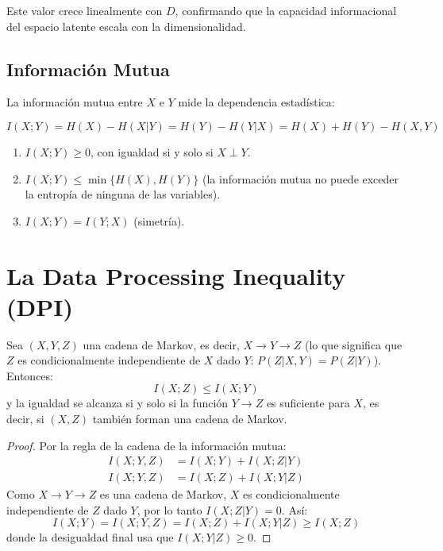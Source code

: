 Este valor crece linealmente con $D$, confirmando que la capacidad informacional
del espacio latente escala con la dimensionalidad.

\subsection{Información Mutua}

La información mutua entre $X$ e $Y$ mide la dependencia estadística:

\begin{equation}
I(X; Y) = H(X) - H(X|Y) = H(Y) - H(Y|X) = H(X) + H(Y) - H(X,Y)
\label{eq:mutual_info}
\end{equation}

\begin{theorem}
\label{thm:mi_props}
\begin{enumerate}
\item $I(X; Y) \ge 0$, con igualdad si y solo si $X \perp Y$.
\item $I(X; Y) \le \min\{H(X), H(Y)\}$ (la información mutua no puede exceder
la entropía de ninguna de las variables).
\item $I(X; Y) = I(Y; X)$ (simetría).
\end{enumerate}
\end{theorem}

\section{La Data Processing Inequality (DPI)}

\begin{theorem}
\label{thm:dpi_formal}
Sea $(X, Y, Z)$ una cadena de Markov, es decir, $X \to Y \to Z$
(lo que significa que $Z$ es condicionalmente independiente de $X$ dado $Y$:
$P(Z|X,Y) = P(Z|Y)$). Entonces:
\begin{equation}
I(X; Z) \le I(X; Y)
\label{eq:dpi}
\end{equation}
y la igualdad se alcanza si y solo si la función $Y \to Z$ es suficiente
para $X$, es decir, si $(X, Z)$ también forman una cadena de Markov.
\end{theorem}

\begin{proof}
Por la regla de la cadena de la información mutua:
\begin{align}
I(X; Y, Z) &= I(X; Y) + I(X; Z | Y) \\
I(X; Y, Z) &= I(X; Z) + I(X; Y | Z)
\end{align}
Como $X \to Y \to Z$ es una cadena de Markov, $X$ es condicionalmente independiente
de $Z$ dado $Y$, por lo tanto $I(X; Z | Y) = 0$. Así:
\begin{equation}
I(X; Y) = I(X; Y, Z) = I(X; Z) + I(X; Y | Z) \ge I(X; Z)
\end{equation}
donde la desigualdad final usa que $I(X; Y | Z) \ge 0$.
\end{proof}

